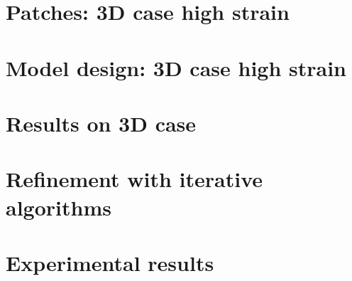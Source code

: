 \section{Patches: 3D case high strain}\label{chp:patches_strain}


\section{Model design: 3D case high strain }\label{chp:3d_nostrain}

\section{Results on 3D case}\label{chp:phasing}
\section{Refinement with iterative algorithms}\label{chp:phasing}
\section{Experimental results}\label{chp:phasing}

